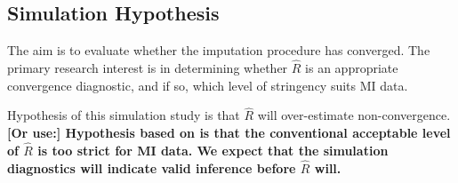 \documentclass[article]{jss}
\begin{document}

\subsection{Simulation Hypothesis} \label{sec:hypothesis}

The aim is to evaluate whether the imputation procedure has converged. The primary research interest is in determining whether $\widehat{R}$ is an appropriate convergence diagnostic, and if so, which level of stringency suits MI data.

Hypothesis of this simulation study is that $\widehat{R}$ will over-estimate non-convergence. \textbf{[Or use:] Hypothesis based on \cite{lace07} is that the conventional acceptable level of $\widehat{R}$ is too strict for MI data. We expect that the simulation diagnostics will indicate valid inference before $\widehat{R}$ will.}


% 
% 
% 
% 
\end{document}
